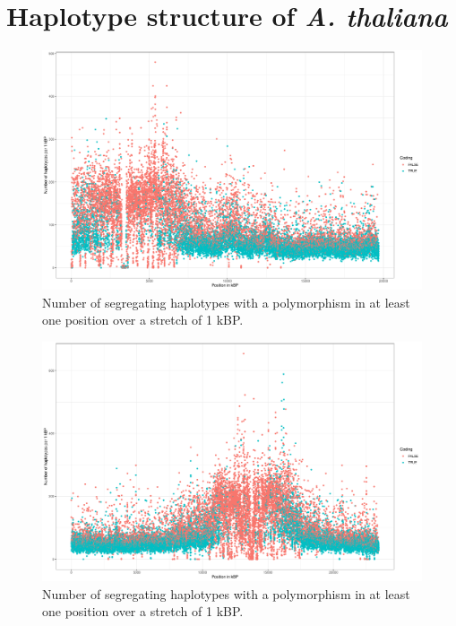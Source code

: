 \section{Haplotype structure of \textit{A. thaliana}} \label{haplo:str}


\begin{figure}[th]
\centering
\includegraphics[height=.55\textheight, width=1.1\textwidth]{Figures/chr2_hap}
\decoRule
\caption[Haplotype strutcture of chromosome 2 of \textit{A. thaliana}]{Number of segregating haplotypes with a polymorphism in at least one position over a stretch of 1 kBP. }
\label{fig:chr2}
\end{figure}


\begin{figure}[th]
\centering
\includegraphics[height=.55\textheight, width=1.1\textwidth]{Figures/chr3_hap}
\decoRule
\caption[Haplotype strutcture of chromosome 3 of \textit{A. thaliana}]{Number of segregating haplotypes with a polymorphism in at least one position over a stretch of 1 kBP. }
\label{fig:chr3}
\end{figure}



